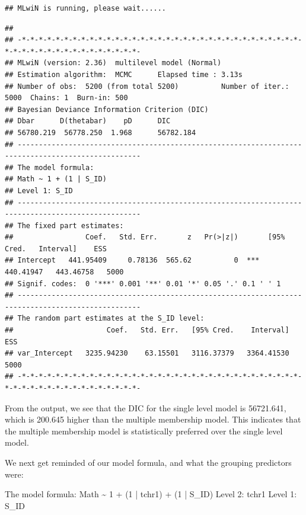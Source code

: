 \documentclass[
]{book}
\newenvironment{Shaded}{\begin{snugshade}}{\end{snugshade}}
\newcommand{\DecValTok}[1]{\textcolor[rgb]{0.00,0.00,0.81}{#1}}
\newcommand{\NormalTok}[1]{#1}
\newcommand{\SpecialCharTok}[1]{\textcolor[rgb]{0.00,0.00,0.00}{#1}}
\begin{document}
\begin{verbatim}
## MLwiN is running, please wait......
\end{verbatim}

\begin{verbatim}
## 
## -*-*-*-*-*-*-*-*-*-*-*-*-*-*-*-*-*-*-*-*-*-*-*-*-*-*-*-*-*-*-*-*-*-*-*-*-*-*-*-*-*-*-*-*-*-*-*-*-*- 
## MLwiN (version: 2.36)  multilevel model (Normal) 
## Estimation algorithm:  MCMC      Elapsed time : 3.13s 
## Number of obs:  5200 (from total 5200)          Number of iter.: 5000  Chains: 1  Burn-in: 500 
## Bayesian Deviance Information Criterion (DIC)
## Dbar      D(thetabar)    pD      DIC
## 56780.219  56778.250  1.968      56782.184  
## --------------------------------------------------------------------------------------------------- 
## The model formula:
## Math ~ 1 + (1 | S_ID)
## Level 1: S_ID      
## --------------------------------------------------------------------------------------------------- 
## The fixed part estimates:  
##                 Coef.   Std. Err.       z   Pr(>|z|)       [95% Cred.   Interval]    ESS 
## Intercept   441.95409     0.78136  565.62          0  ***   440.41947   443.46758   5000 
## Signif. codes:  0 '***' 0.001 '**' 0.01 '*' 0.05 '.' 0.1 ' ' 1  
## --------------------------------------------------------------------------------------------------- 
## The random part estimates at the S_ID level: 
##                      Coef.   Std. Err.   [95% Cred.    Interval]    ESS 
## var_Intercept   3235.94230    63.15501   3116.37379   3364.41530   5000 
## -*-*-*-*-*-*-*-*-*-*-*-*-*-*-*-*-*-*-*-*-*-*-*-*-*-*-*-*-*-*-*-*-*-*-*-*-*-*-*-*-*-*-*-*-*-*-*-*-*-
\end{verbatim}

From the output, we see that the DIC for the single level model is 56721.641, which is 200.645 higher than the multiple membership model. This indicates that the multiple membership model is statistically preferred over the single level model.

We next get reminded of our model formula, and what the grouping predictors were:

\begin{Shaded}
\begin{Highlighting}[]
\NormalTok{The model formula}\SpecialCharTok{:}
\NormalTok{Math }\SpecialCharTok{\textasciitilde{}} \DecValTok{1} \SpecialCharTok{+}\NormalTok{ (}\DecValTok{1} \SpecialCharTok{|}\NormalTok{ tchr1) }\SpecialCharTok{+}\NormalTok{ (}\DecValTok{1} \SpecialCharTok{|}\NormalTok{ S\_ID)}
\NormalTok{Level }\DecValTok{2}\SpecialCharTok{:}\NormalTok{ tchr1     Level }\DecValTok{1}\SpecialCharTok{:}\NormalTok{ S\_ID  }
\end{Highlighting}
\end{Shaded}
\end{document}
